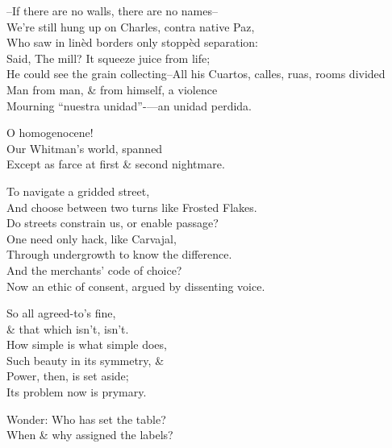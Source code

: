 --If there are no walls, there are no names-- \\
We're still hung up on Charles, contra native Paz, \\
Who saw in linèd borders only stoppèd separation: \\
Said, The mill? It squeeze juice from life; \\
He could see the grain collecting--All his
Cuartos, calles, ruas, rooms divided \\
Man from man, \& from himself, a violence \\
Mourning ``nuestra unidad''-—an unidad perdida.

O homogenocene! \\
Our Whitman's world, spanned \\
Except as farce at first \& second nightmare.

To navigate a gridded street, \\
And choose between two turns like Frosted Flakes. \\
Do streets constrain us, or enable passage? \\
One need only hack, like Carvajal, \\
Through undergrowth to know the difference. \\
And the merchants' code of choice? \\
Now an ethic of consent, argued by dissenting voice. 

So all agreed-to's fine, \\
\qquad \& that which isn't, isn't. \\
How simple is what simple does, \\
Such beauty in its symmetry, \& \\
Power, then, is set aside; \\
Its problem now is prymary.

Wonder: Who has set the table? \\
When \& why assigned the labels?
